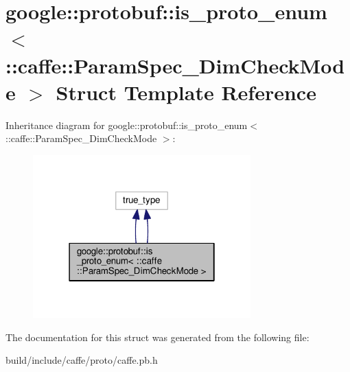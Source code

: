 \hypertarget{structgoogle_1_1protobuf_1_1is__proto__enum_3_01_1_1caffe_1_1_param_spec___dim_check_mode_01_4}{}\section{google\+:\+:protobuf\+:\+:is\+\_\+proto\+\_\+enum$<$ \+:\+:caffe\+:\+:Param\+Spec\+\_\+\+Dim\+Check\+Mode $>$ Struct Template Reference}
\label{structgoogle_1_1protobuf_1_1is__proto__enum_3_01_1_1caffe_1_1_param_spec___dim_check_mode_01_4}


Inheritance diagram for google\+:\+:protobuf\+:\+:is\+\_\+proto\+\_\+enum$<$ \+:\+:caffe\+:\+:Param\+Spec\+\_\+\+Dim\+Check\+Mode $>$\+:
\nopagebreak
\begin{figure}[H]
\begin{center}
\leavevmode
\includegraphics[width=238pt]{structgoogle_1_1protobuf_1_1is__proto__enum_3_01_1_1caffe_1_1_param_spec___dim_check_mode_01_4__inherit__graph}
\end{center}
\end{figure}


The documentation for this struct was generated from the following file\+:\begin{DoxyCompactItemize}
\item 
build/include/caffe/proto/caffe.\+pb.\+h\end{DoxyCompactItemize}
